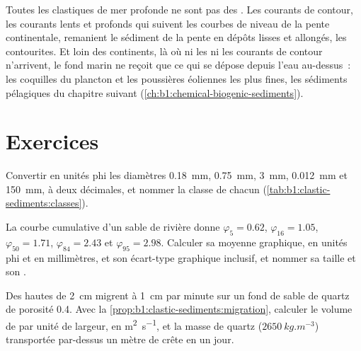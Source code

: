 Toutes les clastiques de mer profonde ne sont pas des . Les courants de contour, les courants lents et
profonds qui suivent les courbes de niveau de la pente continentale, remanient le sédiment
de la pente en dépôts lisses et allongés, les contourites. Et loin des
continents, là où ni les  ni les courants de contour n'arrivent, le
fond marin ne reçoit que ce qui se dépose depuis l'eau au-dessus~: les coquilles du
plancton et les poussières éoliennes les plus fines, les sédiments pélagiques du chapitre
suivant (\cref{ch:b1:chemical-biogenic-sediments}).

\section{Exercices}

\begin{exercise}[$\star$]\label{exo:b1:clastic-sediments:1}
Convertir en unités phi les diamètres \qty{0.18}{mm}, \qty{0.75}{mm},
\qty{3}{mm}, \qty{0.012}{mm} et \qty{150}{mm}, à deux décimales, et nommer la
classe de chacun (\cref{tab:b1:clastic-sediments:classes}).
\end{exercise}

\begin{exercise}[$\star$]\label{exo:b1:clastic-sediments:2}
La courbe cumulative d'un sable de rivière donne $\varphi_5 = 0.62$, $\varphi_{16} =
1.05$, $\varphi_{50} = 1.71$, $\varphi_{84} = 2.43$ et $\varphi_{95} = 2.98$.
Calculer sa moyenne graphique, en unités phi et en millimètres, et son écart-type
graphique inclusif, et nommer sa taille et son .
\end{exercise}

\begin{exercise}[$\star$]\label{exo:b1:clastic-sediments:3}
Des  hautes de \qty{2}{cm} migrent à \qty{1}{cm} par minute sur un fond de sable de quartz
de porosité \num{0.4}. Avec la \cref{prop:b1:clastic-sediments:migration},
calculer le volume de  par unité de largeur, en \si{m^2.s^{-1}}, et la masse
de quartz ($\qty{2650}{kg.m^{-3}}$) transportée par-dessus un mètre de crête en un jour.
\end{exercise}

